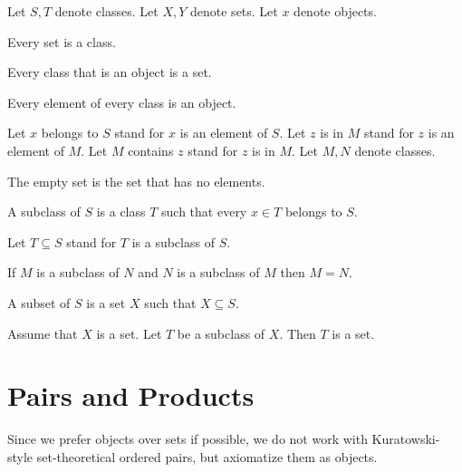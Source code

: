 \documentclass[11pt]{article}
\begin{document}
\begin{forthel}
Let $S,T$ denote classes. Let $X,Y$ denote sets.
Let $x$ denote objects.

\begin{lemma} Every set is a class. \end{lemma}

\begin{lemma} Every class that is an object is a set. \end{lemma}

\begin{axiom} Every element of every class is an object.
\end{axiom}

Let $x$ belongs to $S$ stand for $x$ is an element of $S$.
Let $z$ is in $M$ stand for $z$ is an element of $M$.
Let $M$ contains $z$ stand for $z$ is in $M$.
Let $M,N$ denote classes.

\begin{definition} The empty set is the set that has
no elements.
\end{definition}
  
\begin{definition}
A subclass of $S$ is a class $T$ such that every $x \in T$ 
belongs to $S$.
\end{definition}

Let $T \subseteq S$ stand for $T$ is a subclass of $S$.

\begin{lemma}  If $M$ is a subclass of $N$ and 
$N$ is a subclass of $M$ then $M = N$.
\end{lemma}

\begin{definition}
A subset of $S$ is a set $X$ such that $X \subseteq S$. 
\end{definition}

\begin{axiom}  Assume that $X$ is a set. 
Let $T$ be a subclass of $X$. Then $T$ is a set.
\end{axiom}

\end{forthel}
\section{Pairs and Products}
Since we prefer objects over sets if possible, we do not work
with Kuratowski-style set-theoretical ordered pairs, but
axiomatize them as objects. 
\end{document}
